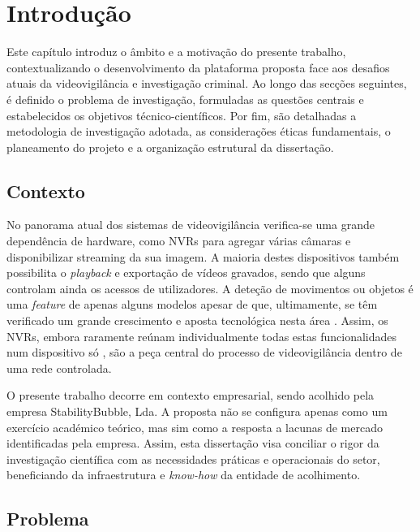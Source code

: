 % 
\chapter{Introdução} %
\label{chap:introducao}

Este capítulo introduz o âmbito e a motivação do presente trabalho, contextualizando o desenvolvimento da plataforma proposta face aos desafios atuais da videovigilância e investigação criminal. Ao longo das secções seguintes, é definido o problema de investigação, formuladas as questões centrais e estabelecidos os objetivos técnico-científicos. Por fim, são detalhadas a metodologia de investigação adotada, as considerações éticas fundamentais, o planeamento do projeto e a organização estrutural da dissertação.

\section{Contexto}
\label{sec:contexto}

No panorama atual dos sistemas de videovigilância verifica-se uma grande dependência de hardware, como \glspl{NVR} para agregar várias câmaras e disponibilizar streaming da sua imagem. A maioria destes dispositivos também possibilita o \textit{playback} e exportação de vídeos gravados, sendo que alguns controlam ainda os acessos de utilizadores. A deteção de movimentos ou objetos é uma \textit{feature} de apenas alguns modelos apesar de que, ultimamente, se têm verificado um grande crescimento e aposta tecnológica nesta área \cite{6491471}. Assim, os \glspl{NVR}, embora raramente reúnam individualmente todas estas funcionalidades num dispositivo só \cite{damjanovski2014cctv}, são a peça central do processo de videovigilância dentro de uma rede controlada.

O presente trabalho decorre em contexto empresarial, sendo acolhido pela empresa StabilityBubble, Lda. A proposta não se configura apenas como um exercício académico teórico, mas sim como a resposta a lacunas de mercado identificadas pela empresa. Assim, esta dissertação visa conciliar o rigor da investigação científica com as necessidades práticas e operacionais do setor, beneficiando da infraestrutura e \textit{know-how} da entidade de acolhimento.

\section{Problema}
\label{sec:problema}


